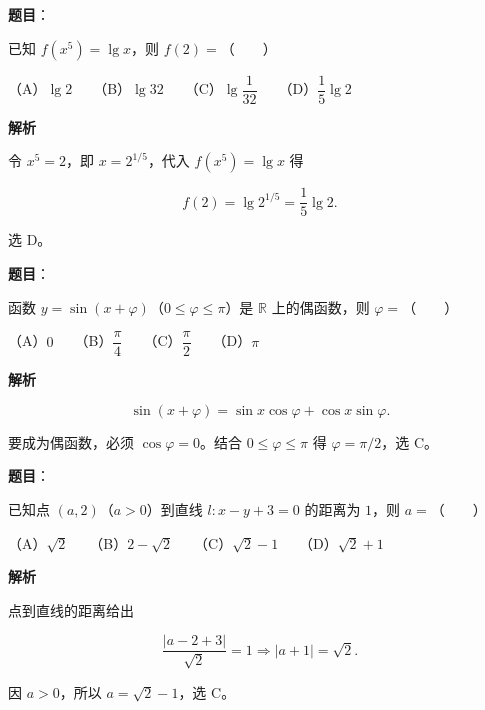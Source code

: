 \begin{answer}

\textbf{题目}：

已知 $f(x^5)=\lg x$，则 $f(2)=$\mbox{（　　）}

（A）$\lg2$　　（B）$\lg32$　　（C）$\lg\dfrac1{32}$　　（D）$\dfrac15\lg2$

\textbf{解析}

令 $x^5=2$，即 $x=2^{1/5}$，代入 $f(x^5)=\lg x$ 得

\nopagebreak[4]
\[
f(2)=\lg 2^{1/5}=\frac15\lg2.
\]

选 D。


\end{answer}
\begin{answer}

\textbf{题目}：

函数 $y=\sin(x+\varphi)$（$0\leqslant\varphi\leqslant\pi$）是 $\mathbb R$ 上的偶函数，则 $\varphi=$\mbox{（　　）}

（A）$0$　　（B）$\dfrac\pi4$　　（C）$\dfrac\pi2$　　（D）$\pi$

\textbf{解析}

\nopagebreak[4]
\[
\sin(x+\varphi)=\sin x\cos\varphi+\cos x\sin\varphi.
\]

要成为偶函数，必须 $\cos\varphi=0$。结合 $0\leqslant\varphi\leqslant\pi$ 得 $\varphi=\pi/2$，选 C。


\end{answer}
\begin{answer}

\textbf{题目}：

已知点 $(a,2)$（$a>0$）到直线 $l:x-y+3=0$ 的距离为 $1$，则 $a=$\mbox{（　　）}

（A）$\sqrt2$　　（B）$2-\sqrt2$　　（C）$\sqrt2-1$　　（D）$\sqrt2+1$

\textbf{解析}

点到直线的距离给出

\nopagebreak[4]
\[
\frac{|a-2+3|}{\sqrt2}=1
\Longrightarrow |a+1|=\sqrt2.
\]

因 $a>0$，所以 $a=\sqrt2-1$，选 C。


\end{answer}

